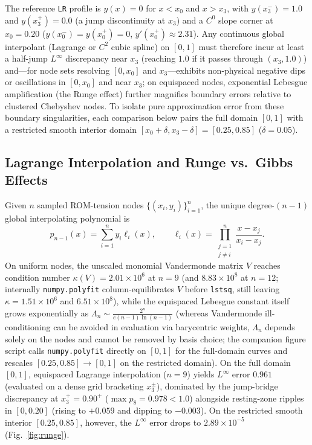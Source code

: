 \documentclass[10pt,twocolumn,letterpaper]{article}
\theoremstyle{plain}
\theoremstyle{definition}
\begin{document}
The reference \texttt{LR} profile is $y(x) = 0$ for $x < x_0$ and $x > x_3$, with $y(x_3^-) = 1.0$ and $y(x_3^+) = 0.0$ (a jump discontinuity at $x_3$) and a $C^0$ slope corner at $x_0 = 0.20$ ($y(x_0^-) = y(x_0^+) = 0$, $y'(x_0^+) \approx 2.31$). Any continuous global interpolant (Lagrange or $C^2$ cubic spline) on $[0, 1]$ must therefore incur at least a half-jump $L^\infty$ discrepancy near $x_3$ (reaching $1.0$ if it passes through $(x_3, 1.0)$) and—for node sets resolving $[0, x_0]$ and $x_3$—exhibits non-physical negative dips or oscillations in $[0, x_0]$ and near $x_3$; on equispaced nodes, exponential Lebesgue amplification (the Runge effect) further magnifies boundary errors relative to clustered Chebyshev nodes. To isolate pure approximation error from these boundary singularities, each comparison below pairs the full domain $[0, 1]$ with a restricted smooth interior domain $[x_0 + \delta, x_3 - \delta] = [0.25, 0.85]$ ($\delta = 0.05$).

\subsection{Lagrange Interpolation and Runge vs.\ Gibbs Effects}
Given $n$ sampled ROM-tension nodes $\{(x_i, y_i)\}_{i=1}^n$, the unique degree-$(n-1)$ global interpolating polynomial is
\begin{equation}
  p_{n-1}(x) = \sum_{i=1}^{n} y_i \ell_i(x), \qquad \ell_i(x) = \prod_{\substack{j=1 \\ j \ne i}}^{n} \frac{x - x_j}{x_i - x_j}.
\end{equation}
On uniform nodes, the unscaled monomial Vandermonde matrix $V$ reaches condition number $\kappa(V) = 2.01 \times 10^6$ at $n=9$ (and $8.83 \times 10^8$ at $n=12$; internally \texttt{numpy.polyfit} column-equilibrates $V$ before \texttt{lstsq}, still leaving $\kappa = 1.51 \times 10^6$ and $6.51 \times 10^8$), while the equispaced Lebesgue constant itself grows exponentially as $\Lambda_n \sim \frac{2^{n}}{e(n-1)\ln(n-1)}$ (whereas Vandermonde ill-conditioning can be avoided in evaluation via barycentric weights, $\Lambda_n$ depends solely on the nodes and cannot be removed by basis choice; the companion figure script calls \texttt{numpy.polyfit} directly on $[0, 1]$ for the full-domain curves and rescales $[0.25, 0.85] \to [0, 1]$ on the restricted domain). On the full domain $[0, 1]$, equispaced Lagrange interpolation ($n=9$) yields $L^\infty$ error $0.961$ (evaluated on a dense grid bracketing $x_3^\pm$), dominated by the jump-bridge discrepancy at $x_3^+ = 0.90^+$ ($\max p_8 = 0.978 < 1.0$) alongside resting-zone ripples in $[0, 0.20]$ (rising to $+0.059$ and dipping to $-0.003$). On the restricted smooth interior $[0.25, 0.85]$, however, the $L^\infty$ error drops to $2.89 \times 10^{-5}$ (Fig.~\ref{fig:runge}).
\end{document}
